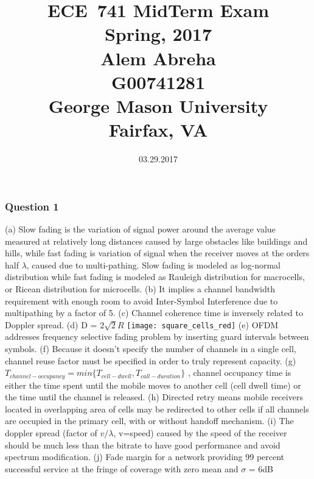 \documentclass[12pt]{article}
\begin{document}
\pagestyle{empty}
\title{\huge{ECE~741 MidTerm Exam\\Spring, 2017}
\vspace{50mm}
\\\large{Alem Abreha\\ G00741281}\vspace{5mm}
\\\large{George Mason University\\Fairfax, VA}}
\date{03.29.2017}
\maketitle
\newpage
\subsubsection*{Question 1}
\vspace{5mm}
(a) Slow fading is the variation of signal power around the average value measured at relatively long distances caused by large obstacles like buildings and hills, while fast fading is variation of signal when the receiver moves at the orders half \(\lambda\), caused due to multi-pathing. Slow fading is modeled as log-normal distribution while fast fading is modeled as Rauleigh distribution for macrocells, or Ricean distribution for microcells.
\newline 
(b) It implies a channel bandwidth requirement with enough room to avoid Inter-Symbol Interference due to multipathing by a factor of 5. 
\newline
(c) Channel coherence time is inversely related to Doppler spread.
\newline
(d) D = \(2\sqrt{2}R\)
\newline	
\texttt{[image: square\_cells\_red]}
\newline
(e) OFDM addresses frequency selective fading problem by inserting guard intervals between symbols.
\newline
(f) Because it doesn't specify the number of channels in a single cell, channel reuse factor must be specified in order to truly represent capacity.
\newline
(g) \(T_{channel-occupancy} = min\{{ T_{cell-dwell},T_{call-duration} \}}\) , channel occupancy time is either the time spent until the mobile moves to another cell (cell dwell time) or the time until the channel is released. 
\newline
(h) Directed retry means mobile receivers located in overlapping area of cells may be redirected to other cells if all channels are occupied in the primary cell, with or without handoff mechanism.
\newline
(i) The doppler spread (factor of \(v/\lambda\), v=speed) caused by the speed of the receiver should be much less than the bitrate to have good performance and avoid spectrum modification.
\newline
(j) Fade margin for a network providing 99 percent successful service at the fringe of coverage with zero mean and \(\sigma\) = 6dB
\end{document}
